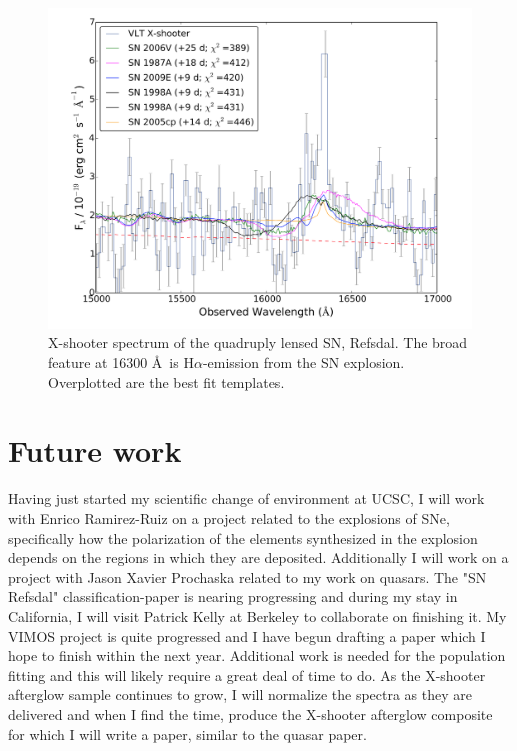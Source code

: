 \begin{figure}[htb]
	\includegraphics[width=\textwidth]{gfx/SNref}
	\caption{X-shooter spectrum of the quadruply lensed SN, Refsdal. The broad feature at 16300 \AA~is H$\alpha$-emission from the SN explosion. Overplotted are the best fit templates.}
	\label{fig:intro:snmet}
\end{figure}



\clearpage

\section{Future work}
\label{sec:intro:fut}

Having just started my scientific change of environment at UCSC, I will work
with Enrico Ramirez-Ruiz on a project related to the explosions of SNe,
specifically how the polarization of the elements synthesized in the explosion
depends on the regions in which they are deposited. Additionally I will work on
a project with Jason Xavier Prochaska related to my work on quasars. 
The "SN Refsdal" classification-paper is nearing progressing and during my stay
in California, I will visit Patrick Kelly at Berkeley to collaborate on
finishing it. My VIMOS project is quite progressed and I have begun drafting a
paper which I hope to finish within the next year. Additional work is needed for
the population fitting and this will likely require a great deal of time to  do.
As the X-shooter afterglow sample continues to grow, I will normalize the
spectra as they are delivered and when I find the time, produce the X-shooter
afterglow composite for which I will write a paper, similar to the quasar paper.


